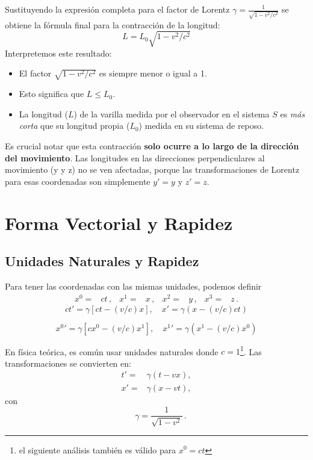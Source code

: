 \documentclass[11pt,a4paper]{article}
\begin{document}
Sustituyendo la expresión completa para el factor de Lorentz $\gamma = \frac{1}{\sqrt{1-v^2/c^2}}$ se obtiene la fórmula final para la contracción de la longitud:
\[ \boxed{ L = L_0 \sqrt{1 - v^2/c^2} } \]
Interpretemos este resultado:
\begin{itemize}
    \item El factor $\sqrt{1 - v^2/c^2}$ es siempre menor o igual a 1.
    \item Esto significa que $L \le L_0$.
    \item La longitud ($L$) de la varilla medida por el observador en el sistema $S$ es \textit{más corta} que su longitud propia ($L_0$) medida en su sistema de reposo.
\end{itemize}
Es crucial notar que esta contracción \textbf{solo ocurre a lo largo de la dirección del movimiento}. Las longitudes en las direcciones perpendiculares al movimiento (y y z) no se ven afectadas, porque las transformaciones de Lorentz para esas coordenadas son simplemente $y' = y$ y $z' = z$.

\section{Forma Vectorial y Rapidez}

\subsection{Unidades Naturales y Rapidez}
Para tener las coordenadas con las mismas unidades, podemos definir
\begin{align}
    x^0 =& ct\,, & x^1 =& x \,, & x^2 =& y \,, & x^3 =& z\,.
\end{align}
\[ ct' = \gamma[ct-(v/c)x], \quad x'=\gamma(x-(v/c)ct) \]

\[ {x^0}' = \gamma[c{x^0}-(v/c){x^1}], \quad {x^1}'=\gamma({x^1}-(v/c){x^0}) \]

En física teórica, es común usar unidades naturales donde $c=1$\footnote{el siguiente análisis también es válido para $x^0 = ct$}. Las transformaciones se convierten en:
\begin{align*}
   t' =& \gamma(t-vx),\\ 
   x'=&\gamma(x-vt),
\end{align*}
con
\[  \quad \gamma = \frac{1}{\sqrt{1-v^2}}\,. \]
\end{document}
